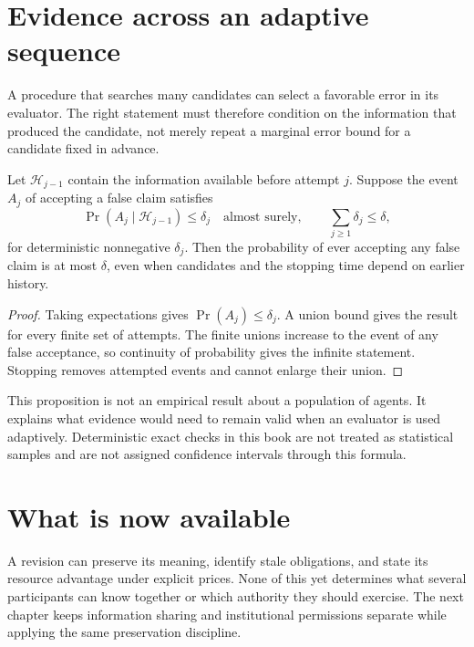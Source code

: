 \section{Evidence across an adaptive sequence}
A procedure that searches many candidates can select a favorable error in its evaluator. The right statement must therefore condition on the information that produced the candidate, not merely repeat a marginal error bound for a candidate fixed in advance.

\begin{proposition}\label{r:lineage}
Let $\mathcal H_{j-1}$ contain the information available before attempt $j$. Suppose the event $A_j$ of accepting a false claim satisfies
\[
\Pr(A_j\mid\mathcal H_{j-1})\le\delta_j\quad\text{almost surely},
\qquad\sum_{j\ge1}\delta_j\le\delta,
\]
for deterministic nonnegative $\delta_j$. Then the probability of ever accepting any false claim is at most $\delta$, even when candidates and the stopping time depend on earlier history.
\end{proposition}
\begin{proof}
Taking expectations gives $\Pr(A_j)\le\delta_j$. A union bound gives the result for every finite set of attempts. The finite unions increase to the event of any false acceptance, so continuity of probability gives the infinite statement. Stopping removes attempted events and cannot enlarge their union.
\end{proof}

This proposition is not an empirical result about a population of agents. It explains what evidence would need to remain valid when an evaluator is used adaptively. Deterministic exact checks in this book are not treated as statistical samples and are not assigned confidence intervals through this formula.

\section*{What is now available}
A revision can preserve its meaning, identify stale obligations, and state its resource advantage under explicit prices. None of this yet determines what several participants can know together or which authority they should exercise. The next chapter keeps information sharing and institutional permissions separate while applying the same preservation discipline.

